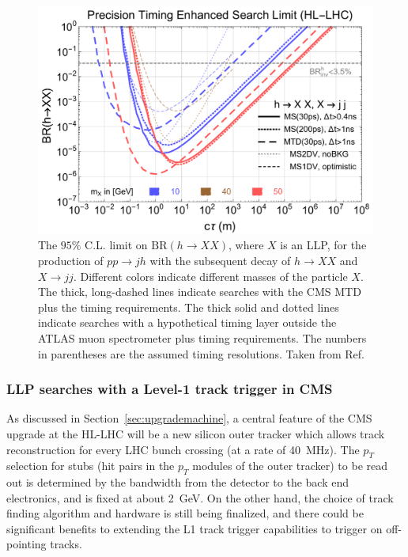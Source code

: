 \begin{figure}[ht]
    \centering
    \includegraphics[width=1.0\columnwidth]{figures/MTD/10-20-50-MC-Lcalc-BRlimit-with-deltaT-cut-MS-1ns.pdf}
    \caption{The $95\%$ C.L. limit on $\text{BR}(h \to XX)$, where $X$ is an LLP, for the production of $pp \to j h$ with the subsequent decay of $h\to X X$ and $X \to j j$. Different colors indicate different masses of the particle $X$. The thick, long-dashed lines indicate searches with the CMS MTD plus the timing requirements. The thick solid and dotted lines indicate searches with a hypothetical timing layer outside the ATLAS muon spectrometer plus timing requirements. The numbers in parentheses are the assumed timing resolutions. Taken from Ref.~\cite{Liu:2018wte}}
    \label{fig:ctaulimitHiggs}
\end{figure}

\subsubsection{LLP searches with a Level-1 track trigger in CMS}


As discussed in Section~\ref{sec:upgrademachine}, a central feature of the CMS upgrade at the HL-LHC will be a new silicon outer tracker which allows track reconstruction for every LHC bunch crossing (at a rate of 40~MHz). The $p_T$ selection for stubs (hit pairs in the $p_T$ modules of the outer tracker) to be read out is determined by the bandwidth from the detector to the back end electronics, and is fixed at about 2~GeV. On the other hand, the choice of track finding algorithm and hardware is still being finalized, and there could be significant benefits to extending the L1 track trigger capabilities to trigger on off-pointing tracks.

